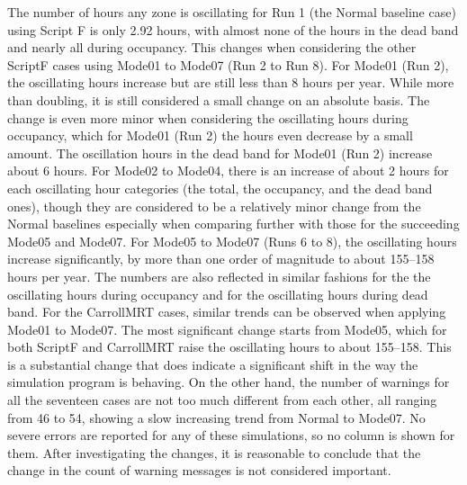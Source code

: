 The number of hours any zone is oscillating for Run 1 (the Normal baseline case) using Script F is only 2.92 hours, with almost none of the hours in the dead band and nearly all during occupancy. This changes when considering the other ScriptF cases using Mode01 to Mode07 (Run 2 to Run 8). For Mode01 (Run 2), the oscillating hours increase but are still less than 8 hours per year. While more than doubling, it is still considered a small change on an absolute basis. The change is even more minor when considering the oscillating hours during occupancy, which for Mode01 (Run 2) the hours even decrease by a small amount. The oscillation hours in the dead band for Mode01 (Run 2) increase about 6 hours. For Mode02 to Mode04, there is an increase of about 2 hours for each oscillating hour categories (the total, the occupancy, and the dead band ones), though they are considered to be a relatively minor change from the Normal baselines especially when comparing further with those for the succeeding Mode05 and Mode07. For Mode05 to Mode07 (Runs 6 to 8), the oscillating hours increase significantly, by more than one order of magnitude to about 155--158 hours per year. The numbers are also reflected in similar fashions for the the oscillating hours during occupancy and for the oscillating hours during dead band. For the CarrollMRT cases, similar trends can be observed when applying Mode01 to Mode07. The most significant change starts from Mode05, which for both ScriptF and CarrollMRT raise the oscillating hours to about 155--158. This is a substantial change that does indicate a significant shift in the way the simulation program is behaving. On the other hand, the number of warnings for all the seventeen cases are not too much different from each other, all ranging from 46 to 54, showing a slow increasing trend from Normal to Mode07. No severe errors are reported for any of these simulations, so no column is shown for them. After investigating the changes, it is reasonable to conclude that the change in the count of warning messages is not considered important.

